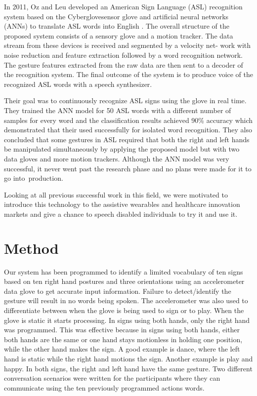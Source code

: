 In 2011, Oz and Leu developed an American Sign Language (ASL) recognition system based on the Cyberglove\texttrademark sensor glove and artificial neural networks (ANNs) to translate ASL words into English \parencite{Oz2011}. The overall structure of the proposed system consists of a sensory glove and a motion tracker. The data stream from these devices is received and segmented by a velocity net- work with noise reduction and feature extraction followed by a word recognition network. The gesture features extracted from the raw data are then sent to a decoder of the recognition system. The final outcome of the system is to produce voice of the recognized ASL words with a speech synthesizer. 

Their goal was to continuously recognize ASL signs using the glove in real time. They trained the ANN model for 50 ASL words with a different number of samples for every word and the classification results achieved 90\% accuracy which demonstrated that their used successfully for isolated word recognition. They also concluded that some gestures in ASL required that both the right and left hands be manipulated simultaneously by applying the proposed model but with two data gloves and more motion trackers. Although the ANN model was very successful, it never went past the research phase and no plans were made for it to go into production. 

Looking at all previous successful work in this field, we were motivated to introduce this technology to the assistive wearables and healthcare innovation markets and give a chance to speech disabled individuals to try it and use it. 

\section{Method}

Our system has been programmed to identify a limited vocabulary of ten signs based on ten right hand postures and three orientations using an accelerometer data glove to get accurate input information. Failure to detect/identify the gesture will result in no words being spoken. The accelerometer was also used to differentiate between when the glove is being used to sign or to play. When the glove is static it starts processing. In signs using both hands, only the right hand was programmed. This was effective because in signs using both hands, either both hands are the same or one hand stays motionless in holding one position, while the other hand makes the sign. A good example is dance, where the left hand is static while the right hand motions the sign. Another example is play and happy. In both signs, the right and left hand have the same gesture. Two different conversation scenarios were written for the participants where they can communicate using the ten previously programmed actions words. 

